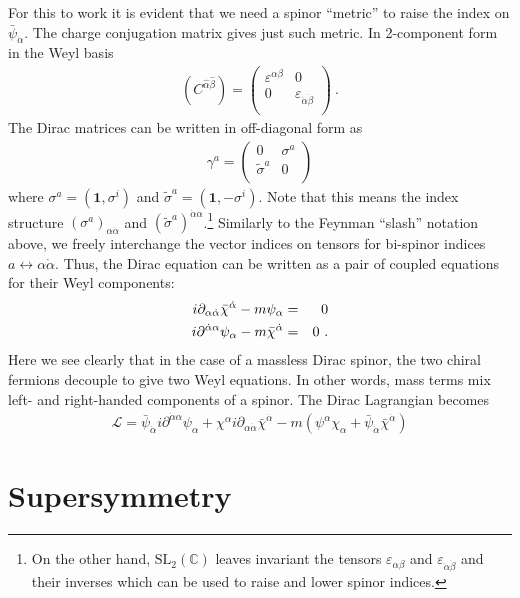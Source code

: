 \documentclass[12pt]{article}
\begin{document}
For this to work it is evident that we need a spinor ``metric'' to raise the index on $\bar \psi_{\dot \alpha}$. The charge conjugation matrix gives just such metric. In 2-component form in the Weyl basis
\begin{eqnarray}
(C^{\hat \alpha \hat \beta})= \begin{pmatrix} 
\varepsilon^{\alpha \beta} &0\\
0& \varepsilon_{\dot \alpha \dot \beta}\\
\end{pmatrix}~.
\end{eqnarray}
The Dirac matrices can be written in off-diagonal form as
\begin{eqnarray}
\gamma^a=\begin{pmatrix} 0& \sigma^a\\ \tilde \sigma^a&0\\ \end{pmatrix}
\end{eqnarray}
where $\sigma^a=(\mathbf 1, \sigma^i)$ and $\tilde \sigma^a=(\mathbf 1, -\sigma^i)$. Note that this means the index structure $(\sigma^a)_{\alpha \dot \alpha}$ and $(\tilde \sigma^a)^{\dot \alpha \alpha}$.\footnote{On the other hand, $\mathrm{SL}_2(\mathbb C)$ leaves invariant the tensors $\varepsilon_{\alpha \beta}$ and $\varepsilon_{\dot \alpha \dot \beta}$ and their inverses which can be used to raise and lower spinor indices.} Similarly to the Feynman ``slash'' notation above, we freely interchange the vector indices on tensors for bi-spinor indices $a\leftrightarrow \alpha \dot \alpha$. Thus, the Dirac equation can be written as a pair of coupled equations for their Weyl components:
\begin{eqnarray}
i\partial_{\alpha \dot \alpha}\bar \chi^{\dot \alpha}-m \psi_\alpha&=&0\cr
i \partial^{\dot \alpha \alpha} \psi_\alpha-m \bar \chi^{\dot \alpha}&=&0~.
\end{eqnarray}
Here we see clearly that in the case of a massless Dirac spinor, the two chiral fermions decouple to give two Weyl equations. In other words, mass terms mix left- and right-handed components of a spinor. The Dirac Lagrangian becomes
\begin{eqnarray}
\mathcal L=  
\bar \psi_{\dot \alpha}i \partial^{\dot \alpha \alpha} \psi_\alpha
+ \chi ^\alpha i \partial_{\alpha \dot \alpha} \bar \chi^{\dot \alpha}
-m (\psi^\alpha\chi_\alpha+\bar \psi_{\dot \alpha}\bar \chi^{\dot \alpha})
\end{eqnarray}


\section{Supersymmetry}
\end{document}
